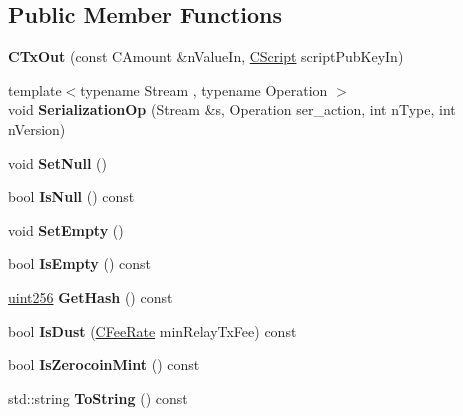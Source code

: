 \subsection*{Public Member Functions}
\begin{DoxyCompactItemize}
\item 
\mbox{\label{class_c_tx_out_adc5daeba4e26f1807cee8ec3cc138ef8}} 
{\bfseries C\+Tx\+Out} (const C\+Amount \&n\+Value\+In, \mbox{\hyperlink{class_c_script}{C\+Script}} script\+Pub\+Key\+In)
\item 
\mbox{\label{class_c_tx_out_a88e5e2f069325d6bb1936ee75935f121}} 
{\footnotesize template$<$typename Stream , typename Operation $>$ }\\void {\bfseries Serialization\+Op} (Stream \&s, Operation ser\+\_\+action, int n\+Type, int n\+Version)
\item 
\mbox{\label{class_c_tx_out_a9fe5e6a1be651f130d3dc84a64e78a24}} 
void {\bfseries Set\+Null} ()
\item 
\mbox{\label{class_c_tx_out_ab92a3c4c95c643f7b3ffd3ffa7cd7055}} 
bool {\bfseries Is\+Null} () const
\item 
\mbox{\label{class_c_tx_out_aef15a8068187af08b25a7ddfbf8d7744}} 
void {\bfseries Set\+Empty} ()
\item 
\mbox{\label{class_c_tx_out_ae5eab8e2d01f678135b8891645db6b78}} 
bool {\bfseries Is\+Empty} () const
\item 
\mbox{\label{class_c_tx_out_af97a27e75b8698951bacc4c5a6ca70af}} 
\mbox{\hyperlink{classuint256}{uint256}} {\bfseries Get\+Hash} () const
\item 
\mbox{\label{class_c_tx_out_ad4440670c7b3a59b46fa44f2f032ded8}} 
bool {\bfseries Is\+Dust} (\mbox{\hyperlink{class_c_fee_rate}{C\+Fee\+Rate}} min\+Relay\+Tx\+Fee) const
\item 
\mbox{\label{class_c_tx_out_a94d2d89e02ab1e8a7d0c2326aaa35725}} 
bool {\bfseries Is\+Zerocoin\+Mint} () const
\item 
\mbox{\label{class_c_tx_out_affdc44390970a14812fe9179768495ef}} 
std\+::string {\bfseries To\+String} () const
\end{DoxyCompactItemize}
